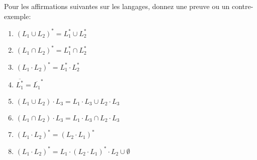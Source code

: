 \documentclass[12pt,french,a4paper]{article}
\begin{document}
\begin{question}
Pour les affirmations suivantes sur les langages, donnez une preuve ou un contre-exemple:
\begin{enumerate}
\item $(L_1 \cup L_2)^* = L_1^* \cup L_2^*$
\item $(L_1 \cap L_2)^* = L_1^* \cap L_2^*$
\item $(L_1 \cdot L_2)^* = L_1^* \cdot L_2^*$
\item $\overline{L_1^*} = \overline{L_1}^*$
\item $(L_1 \cup L_2) \cdot L_3 = L_1 \cdot L_3 \cup L_2 \cdot L_3$
\item $(L_1 \cap L_2) \cdot L_3 = L_1 \cdot L_3 \cap L_2 \cdot L_3$
\item $(L_1 \cdot L_2)^* = (L_2 \cdot L_1)^*$
\item $(L_1 \cdot L_2)^* = L_1 \cdot (L_2 \cdot L_1)^* \cdot L_2 \cup \emptyset$
\end{enumerate}
\end{question}
\end{document}

